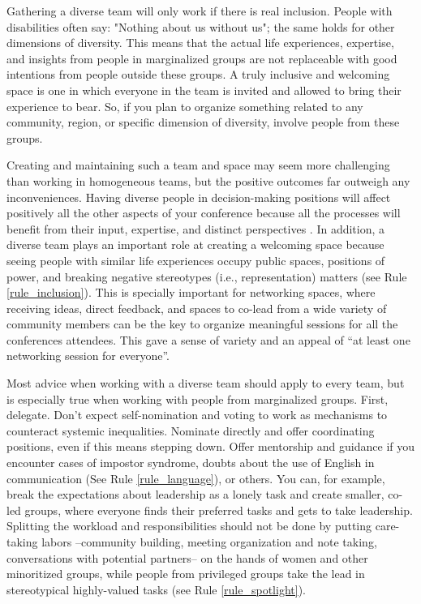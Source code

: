 \documentclass[10pt,letterpaper]{article}
\begin{document}
Gathering a diverse team will only work if there is real inclusion. People with disabilities often say: "Nothing about us without us"; the same holds for other dimensions of diversity. This means that the actual life experiences, expertise, and insights from people in marginalized groups are not replaceable with good intentions from people outside these groups. A truly inclusive and welcoming space is one in which everyone in the team is invited and allowed to bring their experience to bear. So, if you plan to organize something related to any community, region, or specific dimension of diversity, involve people from these groups. 

Creating and maintaining such a team and space may seem more challenging than working in homogeneous teams, but the positive outcomes far outweigh any inconveniences. 
Having diverse people in decision-making positions will affect positively all the other aspects of your conference because all the processes will benefit from their input, expertise, and distinct perspectives \cite{hongGroupsDiverseProblem2004}. In addition, a diverse team plays an important role at creating a welcoming space because seeing people with similar life experiences occupy public spaces, positions of power, and breaking negative stereotypes (i.e., representation) matters (see Rule \ref{rule_inclusion}). This is specially important for networking spaces, where receiving ideas, direct feedback, and spaces to co-lead from a wide variety of community members can be the key to organize meaningful sessions for all the conferences attendees. This gave a sense of variety and an appeal of “at least one networking session for everyone”. %


Most advice when working with a diverse team should apply to every team, but is especially true when working with people from marginalized groups. First, delegate. Don't expect self-nomination and voting to work as mechanisms to counteract systemic inequalities. Nominate directly and offer coordinating positions, even if this means stepping down. Offer mentorship and guidance if you encounter cases of impostor syndrome, doubts about the use of English in communication (See Rule \ref{rule_language}), or others. You can, for example, break the expectations about leadership as a lonely task and create smaller, co-led groups, where everyone finds their preferred tasks and gets to take leadership. Splitting the workload and responsibilities should not be done by putting care-taking labors --community building, meeting organization and note taking, conversations with potential partners-- on the hands of women and other minoritized groups, while people from privileged groups take the lead in stereotypical highly-valued tasks (see Rule \ref{rule_spotlight}). 
\end{document}
